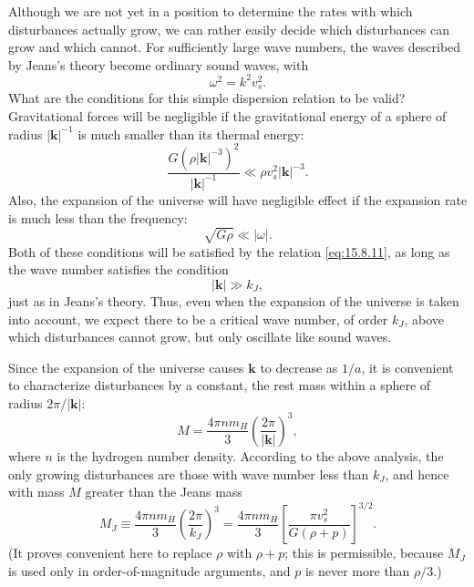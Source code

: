 Although we are not yet in a position to determine the rates with which
disturbances actually grow, we can rather easily decide which disturbances
can grow and which cannot. For sufficiently large wave numbers, the waves
described by Jeans's theory become ordinary sound waves, with
\begin{equation}
  \omega^2=k^2v_s^2.
  \tag{15.8.11}\label{eq:15.8.11}
\end{equation}
What are the conditions for this simple dispersion relation to be valid?
Gravitational forces will be negligible if the gravitational energy of a
sphere of radius \(\lvert\mathbf k\rvert^{-1}\) is much smaller than its
thermal energy:
\[
  \frac{G(\rho\lvert\mathbf k\rvert^{-3})^2}
       {\lvert\mathbf k\rvert^{-1}}
  \ll
  \rho v_s^2\lvert\mathbf k\rvert^{-3}.
\]
Also, the expansion of the universe will have negligible effect if the
expansion rate is much less than the frequency:
\[
  \sqrt{G\rho}\ll\lvert\omega\rvert.
\]
Both of these conditions will be satisfied by the relation
\eqref{eq:15.8.11}, as long as the wave number satisfies the condition
\[
  \lvert\mathbf k\rvert\gg k_J,
\]
just as in Jeans's theory. Thus, even when the expansion of the universe is
taken into account, we expect there to be a critical wave number, of order
\(k_J\), above which disturbances cannot grow, but only oscillate like sound
waves.

Since the expansion of the universe causes \(\mathbf k\) to decrease as
\(1/a\), it is convenient to characterize disturbances by a constant, the
rest mass within a sphere of radius \(2\pi/\lvert\mathbf k\rvert\):
\begin{equation}
  M
  =
  \frac{4\pi nm_H}{3}
  \left(
    \frac{2\pi}{\lvert\mathbf k\rvert}
  \right)^3,
  \tag{15.8.12}\label{eq:15.8.12}
\end{equation}
where \(n\) is the hydrogen number density. According to the above analysis,
the only growing disturbances are those with wave number less than \(k_J\),
and hence with mass \(M\) greater than the Jeans mass
\begin{equation}
  M_J
  \equiv
  \frac{4\pi nm_H}{3}
  \left(\frac{2\pi}{k_J}\right)^3
  =
  \frac{4\pi nm_H}{3}
  \left[
    \frac{\pi v_s^2}{G(\rho+p)}
  \right]^{3/2}.
  \tag{15.8.13}\label{eq:15.8.13}
\end{equation}
(It proves convenient here to replace \(\rho\) with \(\rho+p\); this is
permissible, because \(M_J\) is used only in order-of-magnitude arguments,
and \(p\) is never more than \(\rho/3\).)

